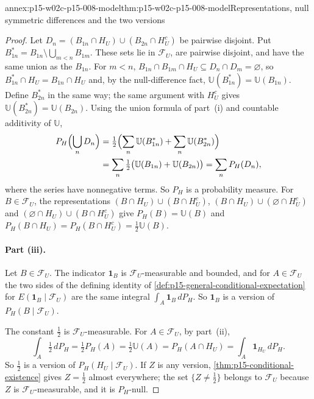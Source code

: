 \begin{annexitem}{annex:p15-w02c-p15-008-model}{thm:p15-w02c-p15-008-model}{Representations, null symmetric differences and the two versions}
\begin{proof}
Let \(D_n=(B_{1n}\cap H_U)\cup(B_{2n}\cap H_U^c)\) be pairwise disjoint.
Put \(B_{1n}^*=B_{1n}\setminus\bigcup_{m<n}B_{1m}\). These sets lie in
\(\mathcal F_U\), are pairwise disjoint, and have the same union as the
\(B_{1n}\). For \(m<n\),
\(B_{1n}\cap B_{1m}\cap H_U\subseteq D_n\cap D_m=\varnothing\), so
\(B_{1n}^*\cap H_U=B_{1n}\cap H_U\) and, by the null-difference fact,
\(\mathbb U(B_{1n}^*)=\mathbb U(B_{1n})\). Define \(B_{2n}^*\) in the same
way; the same argument with \(H_U^c\) gives
\(\mathbb U(B_{2n}^*)=\mathbb U(B_{2n})\). Using the union formula of
part~(i) and countable additivity of \(\mathbb U\),
\[
 \begin{aligned}
 P_H\Bigl(\bigcup_nD_n\Bigr)
  &=\tfrac12\Bigl(\sum_n\mathbb U(B_{1n}^*)+\sum_n\mathbb U(B_{2n}^*)\Bigr)\\
  &=\sum_n\tfrac12\bigl(\mathbb U(B_{1n})+\mathbb U(B_{2n})\bigr)
  =\sum_nP_H(D_n),
 \end{aligned}
\]
where the series have nonnegative terms. So \(P_H\) is a probability
measure. For \(B\in\mathcal F_U\), the representations
\((B\cap H_U)\cup(B\cap H_U^c)\), \((B\cap H_U)\cup(\varnothing\cap H_U^c)\)
and \((\varnothing\cap H_U)\cup(B\cap H_U^c)\) give
\(P_H(B)=\mathbb U(B)\) and
\(P_H(B\cap H_U)=P_H(B\cap H_U^c)=\tfrac12\mathbb U(B)\).

\paragraph{Part (iii).}
Let \(B\in\mathcal F_U\). The indicator \(\mathbf1_B\) is
\(\mathcal F_U\)-measurable and bounded, and for \(A\in\mathcal F_U\) the
two sides of the defining identity of
\cref{def:p15-general-conditional-expectation} for
\(E(\mathbf1_B\mid\mathcal F_U)\) are the same integral
\(\int_A\mathbf1_B\,dP_H\). So \(\mathbf1_B\) is a version of
\(P_H(B\mid\mathcal F_U)\).

The constant \(\tfrac12\) is \(\mathcal F_U\)-measurable. For
\(A\in\mathcal F_U\), by part~(ii),
\[
 \int_A\tfrac12\,dP_H=\tfrac12P_H(A)=\tfrac12\mathbb U(A)
   =P_H(A\cap H_U)=\int_A\mathbf1_{H_U}\,dP_H .
\]
So \(\tfrac12\) is a version of \(P_H(H_U\mid\mathcal F_U)\). If \(Z\) is
any version, \cref{thm:p15-conditional-existence} gives \(Z=\tfrac12\)
almost everywhere; the set \(\{Z\neq\tfrac12\}\) belongs to
\(\mathcal F_U\) because \(Z\) is \(\mathcal F_U\)-measurable, and it is
\(P_H\)-null.
\end{proof}
\end{annexitem}

